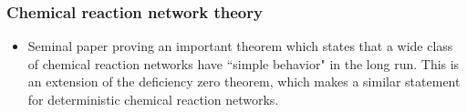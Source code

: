 \documentclass{amsart}
\begin{document}
\subsubsection{Chemical reaction network theory}
\begin{itemize}
\item \cite{Anderson2008aa} Seminal paper proving an important theorem which states that a wide class of chemical reaction networks have ``simple behavior" in the long run. This is an extension of the deficiency zero theorem, which makes a similar statement for deterministic chemical reaction networks. 
\end{itemize}




\end{document}
